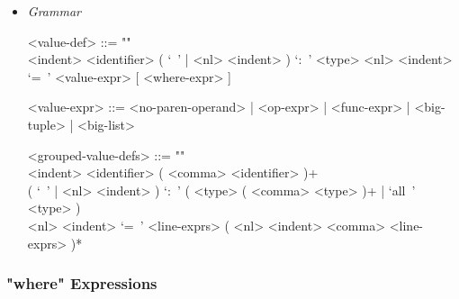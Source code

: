 \documentclass{article}
\begin{document}
\begin{itemize}
\item \textit{Grammar}
\begin{grammar}
<value-def> ::= ""\\
<indent> <identifier> 
( `\ ' | <nl> <indent> ) `:\ ' <type> 
<nl> <indent> `=\ ' <value-expr> [ <where-expr> ]

<value-expr> ::=
<no-paren-operand> | <op-expr> | <func-expr> | <big-tuple> | <big-list>

<grouped-value-defs> ::= ""\\
<indent> <identifier> ( <comma> <identifier> )+ \\
( `\ ' | <nl> <indent> ) `:\ ' ( <type> ( <comma> <type> )+ | `all\ ' <type> ) \\
<nl> <indent> `=\ ' <line-exprs> ( <nl> <indent> <comma> <line-exprs> )*
\end{grammar}

\end{itemize}

\subsubsection{"where" Expressions}
\end{document}
